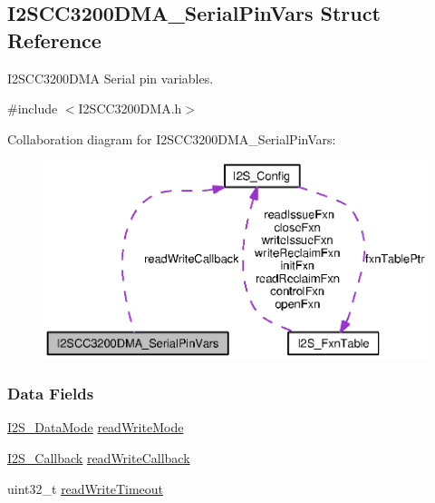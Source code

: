 \subsection{I2\+S\+C\+C3200\+D\+M\+A\+\_\+\+Serial\+Pin\+Vars Struct Reference}
\label{struct_i2_s_c_c3200_d_m_a___serial_pin_vars}


I2\+S\+C\+C3200\+D\+M\+A Serial pin variables.  




{\ttfamily \#include $<$I2\+S\+C\+C3200\+D\+M\+A.\+h$>$}



Collaboration diagram for I2\+S\+C\+C3200\+D\+M\+A\+\_\+\+Serial\+Pin\+Vars\+:
\nopagebreak
\begin{figure}[H]
\begin{center}
\leavevmode
\includegraphics[width=350pt]{struct_i2_s_c_c3200_d_m_a___serial_pin_vars__coll__graph}
\end{center}
\end{figure}
\subsubsection*{Data Fields}
\begin{DoxyCompactItemize}
\item 
\hyperlink{_i2_s_8h_a120b8555bc048186bbd436dbdbb5b405}{I2\+S\+\_\+\+Data\+Mode} \hyperlink{struct_i2_s_c_c3200_d_m_a___serial_pin_vars_a52abc7e26c18aab1439879af71e6db77}{read\+Write\+Mode}
\item 
\hyperlink{_i2_s_8h_af87c5d43590153717044a932ff6b2e03}{I2\+S\+\_\+\+Callback} \hyperlink{struct_i2_s_c_c3200_d_m_a___serial_pin_vars_acb3f51b11bd2def86a83ec939a07cb9a}{read\+Write\+Callback}
\item 
uint32\+\_\+t \hyperlink{struct_i2_s_c_c3200_d_m_a___serial_pin_vars_a72c86fce77d5695732c437577a8f51ef}{read\+Write\+Timeout}
\end{DoxyCompactItemize}


